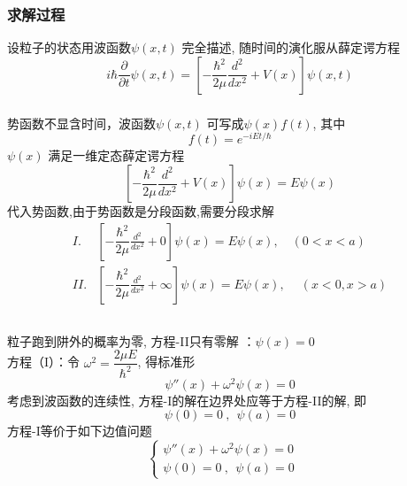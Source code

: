 \begin{frame}
	\frametitle{求解过程}
	\解 设粒子的状态用波函数$ \psi(x,t) $ 完全描述, 随时间的演化服从薛定谔方程
\begin{equation*}
	i\hbar \frac{\partial }{\partial t} \psi(x,t) =\left [ -\dfrac{\hbar^2}{2\mu } \frac{d^2 }{d x^2} + V(x) \right ]\psi(x,t) 
\end{equation*}	
\end{frame}

\begin{frame}
	\frametitle{}	
势函数不显含时间，波函数$ \psi(x,t)$ 可写成$ \psi(x)f(t)$, 其中
$$f(t) = e^{-iEt/\hbar} $$  
$ \psi(x)$ 满足一维定态薛定谔方程
\begin{equation*}
	\left [ -\dfrac{\hbar^2}{2\mu } \frac{d^2 }{d x^2} + V(x) \right ]\psi(x) = E \psi(x)
\end{equation*}
代入势函数,由于势函数是分段函数,需要分段求解
\[\begin{aligned}
	I. &\left [ -\dfrac{\hbar^2}{2\mu } \frac{d^2 }{d x^2} + 0 \right ]\psi(x)  = E \psi(x), \quad (0 < x < a) \\
	II. &\left [ -\dfrac{\hbar^2}{2\mu } \frac{d^2 }{d x^2} + \infty \right ]\psi(x)  = E \psi(x) ,\quad~ ( x < 0, x > a) \\
\end{aligned}\]
\end{frame}

\begin{frame}
	\frametitle{}
	粒子跑到阱外的概率为零, 方程-II只有零解 ：$\psi(x) = 0$ \\
    方程（I）：令 $ \omega ^2= \dfrac{2\mu E}{\hbar ^2} $, 得标准形
\[\psi''(x) + \omega^2	\psi(x)=0\] 
考虑到波函数的连续性, 方程-I的解在边界处应等于方程-II的解, 即
\[\psi(0)=0~,~~ \psi(a)=0\]
方程-I等价于如下边值问题 
	$$ \displaystyle 
		\begin{cases}
			\psi''(x) + \omega^2	\psi(x)=0  \\
			\psi(0)=0~,~~ \psi(a)=0 ~~~~~
		\end{cases}
	$$ 
\end{frame}

